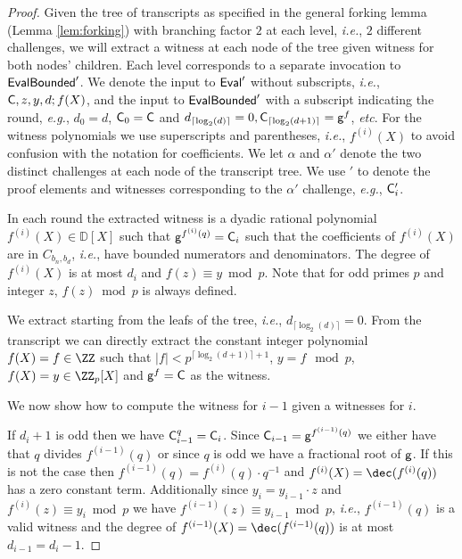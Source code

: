 \documentclass{article}
\theoremstyle{definition}
\begin{document}
\begin{proof}
Given the tree of transcripts as specified in the general forking lemma (Lemma \ref{lem:forking})  with branching factor $2$ at each level, \emph{i.e.}, $2$ different challenges, we will extract a witness at each node of the tree given witness for both nodes' children. Each level corresponds to a separate invocation to $\textsf{{EvalBounded}}'$. We denote the input to $\textsf{{Eval}}'$ without subscripts, \emph{i.e.}, $\mathsf{C},z,y,d;f(X)$, and the input to $\textsf{{EvalBounded}}'$ with a subscript indicating the round, \emph{e.g.}, $d_0=d$, $\mathsf{C}_0=\mathsf{C}$ and $d_{\lceil \log_2(d)\rceil }=0,\mathsf{C}_{\lceil \log_2(d+1)\rceil }=\mathsf{g}^{f}$, \emph{etc}. For the witness polynomials we use superscripts and parentheses, \emph{i.e.}, $f^{(i)}(X)$ to avoid confusion with the notation for coefficients.  We let $\alpha$ and $\alpha'$ denote the two distinct challenges at each node of the transcript tree. We use $'$ to denote the proof elements and witnesses corresponding to the $\alpha'$ challenge, \emph{e.g.}, $\mathsf{C}_i'$.

In each round the extracted witness is a dyadic rational polynomial $f^{(i)}(X)\in \mathbb{D}[X]$ such that $\mathsf{g}^{f^{(i)}(q)}=\mathsf{C}_i$ such that the coefficients of $f^{(i)}(X)$ are in $C_{b_n,b_d}$, \emph{i.e.}, have bounded numerators and denominators. The degree of $f^{(i)}(X)$ is at most $d_i$ and $f(z) \equiv y \bmod p$. Note that for odd primes $p$ and integer $z$, $f(z)\bmod p$ is always defined.

We extract starting from the leafs of the tree, \emph{i.e.}, $d_{\lceil \log_2(d)\rceil}=0$. From the transcript we can directly extract the constant integer polynomial $f(X)=f \in \ZZ$ such that $\vert f \vert < p^{\lceil\log_2(d+1)\rceil+1}$, $y=f \mod p$, $f(X)=y\in \ZZ_p[X]$ and $\mathsf{g}^{f}=\mathsf{C}$ as the witness.

We now show how to compute the witness for $i-1$ given a witnesses for $i$. 

If $d_i+1$ is odd then we have $\mathsf{C}_{i-1}^q=\mathsf{C}_i$. Since $\mathsf{C}_{i-1}=\mathsf{g}^{f^{(i-1)}(q)}$ we either have that $q$ divides $f^{(i-1)}(q)$ or since $q$ is odd we have a fractional root of $\mathsf{g}$. 
If this is not the case then $f^{(i-1)}(q)=f^{(i)}(q)\cdot q^{-1}$ and $f^{(i)}(X)=\dec(f^{(i)}(q))$ has a zero constant term. Additionally since $y_i=y_{i-1}\cdot z$ and $f^{(i)}(z)\equiv y_i \bmod p$ we have $f^{(i-1)}(z)\equiv y_{i-1} \bmod p$, \emph{i.e.}, $f^{(i-1)}(q)$ is a valid witness and the degree of $f^{(i-1)}(X)=\dec(f^{(i-1)}(q))$ is at most $d_{i-1}=d_i-1$. 


\end{proof}
\end{document}
